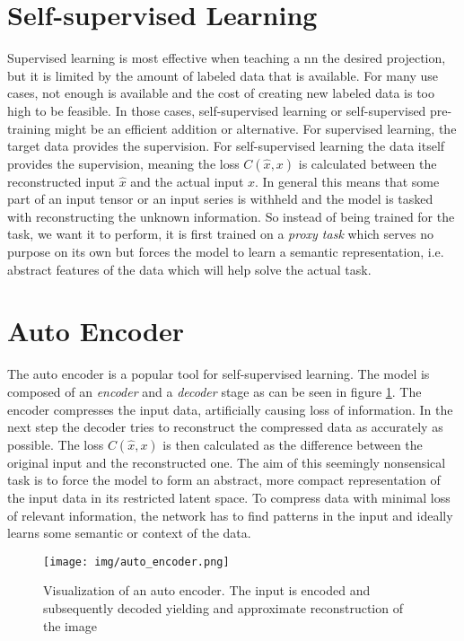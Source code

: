 \section{Self-supervised Learning}

Supervised learning is most effective when teaching a \gls{nn} the desired projection, but it is limited by the amount of labeled data that is available. For many use cases, not enough is available and the cost of creating new labeled data is too high to be feasible. In those cases, self-supervised learning or self-supervised pre-training might be an efficient addition or alternative. For supervised learning, the target data provides the supervision. For self-supervised learning the data itself provides the supervision, meaning the loss $C(\hat{x},x)$ is calculated between the reconstructed input $\hat{x}$ and the actual input $x$. In general this means that some part of an input tensor or an input series is withheld and the model is tasked with reconstructing the unknown information. So instead of being trained for the task, we want it to perform, it is first trained on a \textit{proxy task} which serves no purpose on its own but forces the model to learn a semantic representation, i.e. abstract features of the data which will help solve the actual task.

\section{Auto Encoder} \label{sec:backgrund:autoencoder}

The auto encoder is a popular tool for self-supervised learning. The model is composed of an \textit{encoder} and a \textit{decoder} stage as can be seen in figure \ref{fig:auto_encoder}. The encoder compresses the input data, artificially causing loss of information. In the next step the decoder tries to reconstruct the compressed data as accurately as possible. The loss $C(\hat{x},x)$ is then calculated as the difference between the original input and the reconstructed one. The aim of this seemingly nonsensical task is to force the model to form an abstract, more compact representation of the input data in its restricted latent space. To compress data with minimal loss of relevant information, the network has to find patterns in the input and ideally learns some semantic or context of the data. 

\begin{figure}[h]
	\centering
	\texttt{[image: img/auto\_encoder.png]}
	\caption{Visualization of an auto encoder. The input is encoded and subsequently decoded yielding and approximate reconstruction of the image \cite{auto_encoders}}
	\label{fig:auto_encoder}
\end{figure}

